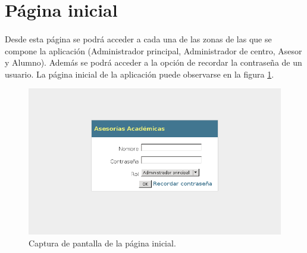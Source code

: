 \section{Página inicial}

  \paragraph{}Desde esta página se podrá acceder a cada una de las zonas de las
  que se compone la aplicación (Administrador principal, Administrador de
  centro, Asesor y Alumno). Además se podrá acceder a la opción de recordar la
  contraseña de un usuario. La página inicial de la aplicación puede
  observarse en la figura \ref{capturaPaginaInicial}.

  \begin{figure}[!ht]
    \begin{center}
      \includegraphics[scale=0.55]{12.Disenyo_Interfaz/12.2.Pagina_Inicial/pagina_inicial.png}
      \caption{Captura de pantalla de la página inicial.}
      \label{capturaPaginaInicial}
    \end{center}
  \end{figure}

